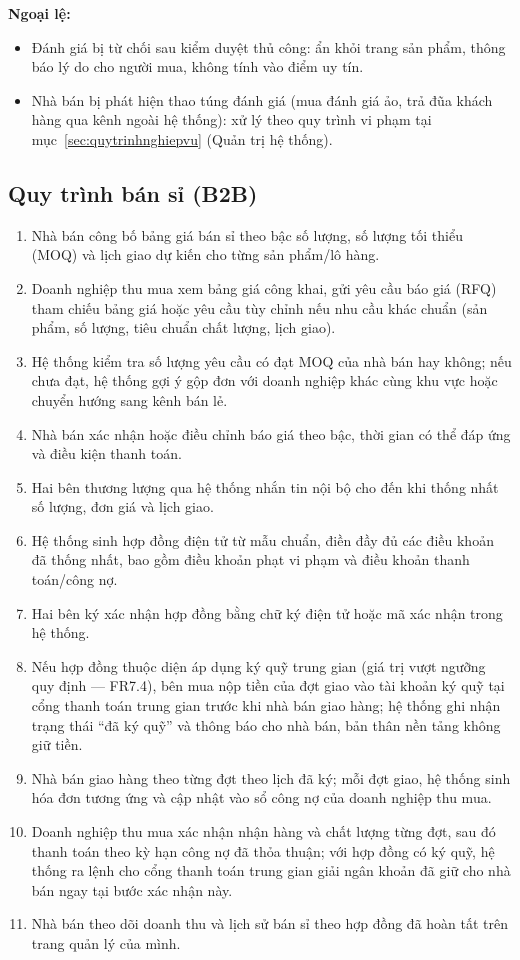\textbf{Ngoại lệ:}
\begin{itemize}
    \item Đánh giá bị từ chối sau kiểm duyệt thủ công: ẩn khỏi trang sản phẩm, thông báo lý do cho người mua, không tính vào điểm uy tín.
    \item Nhà bán bị phát hiện thao túng đánh giá (mua đánh giá ảo, trả đũa khách hàng qua kênh ngoài hệ thống): xử lý theo quy trình vi phạm tại mục~\ref{sec:quytrinhnghiepvu} (Quản trị hệ thống).
\end{itemize}



\subsection{Quy trình bán sỉ (B2B)}

\begin{enumerate}
    \item Nhà bán công bố bảng giá bán sỉ theo bậc số lượng, số lượng tối thiểu (MOQ) và lịch giao dự kiến cho từng sản phẩm/lô hàng.
    \item Doanh nghiệp thu mua xem bảng giá công khai, gửi yêu cầu báo giá (RFQ) tham chiếu bảng giá hoặc yêu cầu tùy chỉnh nếu nhu cầu khác chuẩn (sản phẩm, số lượng, tiêu chuẩn chất lượng, lịch giao).
    \item Hệ thống kiểm tra số lượng yêu cầu có đạt MOQ của nhà bán hay không; nếu chưa đạt, hệ thống gợi ý gộp đơn với doanh nghiệp khác cùng khu vực hoặc chuyển hướng sang kênh bán lẻ.
    \item Nhà bán xác nhận hoặc điều chỉnh báo giá theo bậc, thời gian có thể đáp ứng và điều kiện thanh toán.
    \item Hai bên thương lượng qua hệ thống nhắn tin nội bộ cho đến khi thống nhất số lượng, đơn giá và lịch giao.
    \item Hệ thống sinh hợp đồng điện tử từ mẫu chuẩn, điền đầy đủ các điều khoản đã thống nhất, bao gồm điều khoản phạt vi phạm và điều khoản thanh toán/công nợ.
    \item Hai bên ký xác nhận hợp đồng bằng chữ ký điện tử hoặc mã xác nhận trong hệ thống.
    \item Nếu hợp đồng thuộc diện áp dụng ký quỹ trung gian (giá trị vượt ngưỡng quy định --- FR7.4), bên mua nộp tiền của đợt giao vào tài khoản ký quỹ tại cổng thanh toán trung gian trước khi nhà bán giao hàng; hệ thống ghi nhận trạng thái ``đã ký quỹ'' và thông báo cho nhà bán, bản thân nền tảng không giữ tiền.
    \item Nhà bán giao hàng theo từng đợt theo lịch đã ký; mỗi đợt giao, hệ thống sinh hóa đơn tương ứng và cập nhật vào sổ công nợ của doanh nghiệp thu mua.
    \item Doanh nghiệp thu mua xác nhận nhận hàng và chất lượng từng đợt, sau đó thanh toán theo kỳ hạn công nợ đã thỏa thuận; với hợp đồng có ký quỹ, hệ thống ra lệnh cho cổng thanh toán trung gian giải ngân khoản đã giữ cho nhà bán ngay tại bước xác nhận này.
    \item Nhà bán theo dõi doanh thu và lịch sử bán sỉ theo hợp đồng đã hoàn tất trên trang quản lý của mình.
\end{enumerate}

